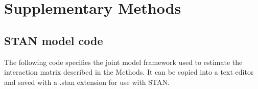 \documentclass[a4,12pt]{article}
\begin{document}

 



% 
% 

\newpage

\printbibliography   

\newpage 

\section{Supplementary Methods}

    \subsection{STAN model code}

    The following code specifies the joint model framework used to estimate the interaction matrix described in the Methods. It can be copied into a text editor and saved with a .stan extension for use with STAN. 

\end{document}
